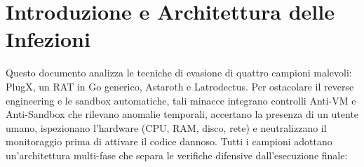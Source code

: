 \documentclass[11pt, a4paper]{article}
\begin{document}
	\tableofcontents
	\newpage
	
	\section{Introduzione e Architettura delle Infezioni}
	
	Questo documento analizza le tecniche di evasione di quattro campioni malevoli: PlugX, un RAT in Go generico, Astaroth e Latrodectus. Per ostacolare il reverse engineering e le sandbox automatiche, tali minacce integrano controlli Anti-VM e Anti-Sandbox che rilevano anomalie temporali, accertano la presenza di un utente umano, ispezionano l'hardware (CPU, RAM, disco, rete) e neutralizzano il monitoraggio prima di attivare il codice dannoso. Tutti i campioni adottano un'architettura multi-fase che separa le verifiche difensive dall'esecuzione finale:
	
\end{document}
